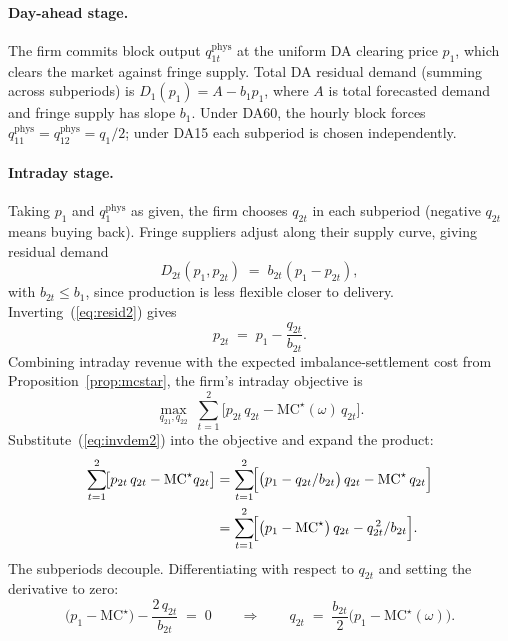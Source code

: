 \documentclass[11pt,a4paper]{article}
\begin{document}
\paragraph{Day-ahead stage.} The firm commits block output $q_{1t}^{\mathrm{phys}}$ at the
uniform DA clearing price $p_1$, which clears the market against fringe supply. Total
DA residual demand (summing across subperiods) is $D_1(p_1) = A - b_1 p_1$, where $A$
is total forecasted demand and fringe supply has slope $b_1$. Under DA60, the hourly
block forces $q_{11}^{\mathrm{phys}} = q_{12}^{\mathrm{phys}} = q_1/2$; under DA15 each
subperiod is chosen independently.

\paragraph{Intraday stage.} Taking $p_1$ and $q_1^{\mathrm{phys}}$ as given, the firm chooses
$q_{2t}$ in each subperiod (negative $q_{2t}$ means buying back). Fringe suppliers adjust along
their supply curve, giving residual demand
\begin{equation}
D_{2t}(p_1, p_{2t}) \;=\; b_{2t}(p_1 - p_{2t}),
\label{eq:resid2}
\end{equation}
with $b_{2t} \leq b_1$, since production is less flexible closer to
delivery. Inverting~(\ref{eq:resid2}) gives
\begin{equation}
p_{2t} \;=\; p_1 - \frac{q_{2t}}{b_{2t}}.
\label{eq:invdem2}
\end{equation}
Combining intraday revenue with the expected imbalance-settlement cost
from Proposition~\ref{prop:mcstar}, the firm's intraday objective is
\begin{equation}
\max_{q_{21},q_{22}} \;\sum_{t=1}^{2} \bigl[p_{2t}\,q_{2t} - \mathrm{MC}^\star(\omega)\,q_{2t}\bigr].
\label{eq:intraday_obj}
\end{equation}
Substitute~(\ref{eq:invdem2}) into the objective and expand the product:
\begin{align*}
\sum_{t=1}^{2}\!\bigl[p_{2t}\,q_{2t}-\mathrm{MC}^\star q_{2t}\bigr]
  &= \sum_{t=1}^{2}\!\Bigl[
      \bigl(p_1 - q_{2t}/b_{2t}\bigr)\,q_{2t}
      - \mathrm{MC}^\star\,q_{2t}
    \Bigr] \\
  &= \sum_{t=1}^{2}\!\Bigl[
      \bigl(p_1-\mathrm{MC}^\star\bigr)\,q_{2t}
      - q_{2t}^{\,2}/b_{2t}
    \Bigr].
\end{align*}
The subperiods decouple. Differentiating with respect to $q_{2t}$ and
setting the derivative to zero:
\[
\bigl(p_1-\mathrm{MC}^\star\bigr) - \frac{2\,q_{2t}}{b_{2t}} \;=\; 0
\qquad\Longrightarrow\qquad
q_{2t} \;=\; \frac{b_{2t}}{2}\bigl(p_1-\mathrm{MC}^\star(\omega)\bigr).
\]
\end{document}
